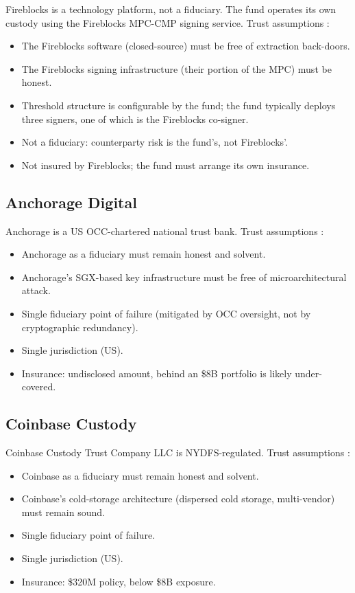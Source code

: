 Fireblocks is a technology platform, not a fiduciary. The fund
operates its own custody using the Fireblocks MPC-CMP signing
service. Trust assumptions \cite{fireblocks}:

\begin{itemize}[nosep]
\item The Fireblocks software (closed-source) must be free of
extraction back-doors.
\item The Fireblocks signing infrastructure (their portion of the
MPC) must be honest.
\item Threshold structure is configurable by the fund; the fund
typically deploys three signers, one of which is the Fireblocks
co-signer.
\item Not a fiduciary: counterparty risk is the fund's, not
Fireblocks'.
\item Not insured by Fireblocks; the fund must arrange its own
insurance.
\end{itemize}

\subsection{Anchorage Digital}

Anchorage is a US OCC-chartered national trust bank. Trust assumptions
\cite{anchorage}:

\begin{itemize}[nosep]
\item Anchorage as a fiduciary must remain honest and solvent.
\item Anchorage's SGX-based key infrastructure must be free of
microarchitectural attack.
\item Single fiduciary point of failure (mitigated by OCC oversight,
not by cryptographic redundancy).
\item Single jurisdiction (US).
\item Insurance: undisclosed amount, behind an \$8B portfolio is
likely under-covered.
\end{itemize}

\subsection{Coinbase Custody}

Coinbase Custody Trust Company LLC is NYDFS-regulated. Trust
assumptions \cite{coinbase-custody}:

\begin{itemize}[nosep]
\item Coinbase as a fiduciary must remain honest and solvent.
\item Coinbase's cold-storage architecture (dispersed cold storage,
multi-vendor) must remain sound.
\item Single fiduciary point of failure.
\item Single jurisdiction (US).
\item Insurance: \$320M policy, below \$8B exposure.
\end{itemize}

